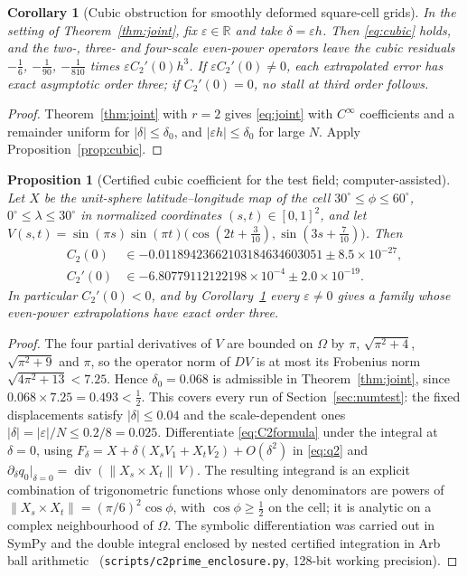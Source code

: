 \documentclass[11pt]{article}
\newtheorem{corollary}{Corollary}
\newtheorem{proposition}{Proposition}
\theoremstyle{remark}
\newcommand{\R}{\mathbb{R}}
\begin{document}
\begin{corollary}[Cubic obstruction for smoothly deformed square-cell grids]
\label{cor:cubicfamily}
In the setting of Theorem~\ref{thm:joint}, fix $\varepsilon\in\R$ and take $\delta=\varepsilon h$.
Then \eqref{eq:cubic} holds, and the two-, three- and four-scale even-power operators leave the
cubic residuals $-\tfrac16$, $-\tfrac1{90}$, $-\tfrac1{810}$ times $\varepsilon C_2'(0)h^3$.
If $\varepsilon C_2'(0)\neq0$, each extrapolated error has exact asymptotic order three; if
$C_2'(0)=0$, no stall at third order follows.
\end{corollary}
\begin{proof}
Theorem~\ref{thm:joint} with $r=2$ gives \eqref{eq:joint} with $C^\infty$ coefficients and a
remainder uniform for $|\delta|\le\delta_0$, and $|\varepsilon h|\le\delta_0$ for large $N$.
Apply Proposition~\ref{prop:cubic}.
\end{proof}

\begin{proposition}[Certified cubic coefficient for the test field; computer-assisted]
\label{prop:certified}
Let $X$ be the unit-sphere latitude--longitude map of the cell
$30^\circ\le\phi\le60^\circ$, $0^\circ\le\lambda\le30^\circ$ in normalized coordinates
$(s,t)\in[0,1]^2$, and let
$V(s,t)=\sin(\pi s)\sin(\pi t)\bigl(\cos(2t+\tfrac3{10}),\sin(3s+\tfrac7{10})\bigr)$. Then
\begin{align*}
C_2(0)&\in-0.01189423662103184634603051\pm8.5\times10^{-27},\\
C_2'(0)&\in-6.80779112122198\times10^{-4}\pm2.0\times10^{-19}.
\end{align*}
In particular $C_2'(0)<0$, and by Corollary~\ref{cor:cubicfamily} every $\varepsilon\neq0$
gives a family whose even-power extrapolations have exact order three.
\end{proposition}
\begin{proof}
The four partial derivatives of $V$ are bounded on $\Omega$ by $\pi$, $\sqrt{\pi^2+4}$,
$\sqrt{\pi^2+9}$ and $\pi$, so the operator norm of $DV$ is at most its Frobenius norm
$\sqrt{4\pi^2+13}<7.25$. Hence $\delta_0=0.068$ is admissible in Theorem~\ref{thm:joint}, since
$0.068\times7.25=0.493<\tfrac12$. This covers every run of Section~\ref{sec:numtest}: the fixed
displacements satisfy $|\delta|\le0.04$ and the scale-dependent ones
$|\delta|=|\varepsilon|/N\le0.2/8=0.025$. Differentiate \eqref{eq:C2formula} under the
integral at $\delta=0$, using $F_\delta=X+\delta(X_sV_1+X_tV_2)+O(\delta^2)$ in \eqref{eq:q2}
and $\partial_\delta q_0|_{\delta=0}=\operatorname{div}(\|X_s\times X_t\|\,V)$. The resulting
integrand is an explicit combination of trigonometric functions whose only denominators are
powers of $\|X_s\times X_t\|=(\pi/6)^2\cos\phi$, with $\cos\phi\ge\tfrac12$ on the cell; it is
analytic on a complex neighbourhood of $\Omega$. The symbolic differentiation was carried out
in SymPy and the double integral enclosed by nested certified integration in Arb ball
arithmetic~\cite{johansson} (\texttt{scripts/c2prime\_enclosure.py}, 128-bit working
precision).
\end{proof}
\end{document}
